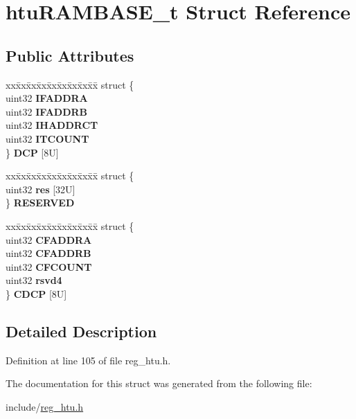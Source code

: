 \hypertarget{structhtuRAMBASE__t}{}\section{htu\+R\+A\+M\+B\+A\+S\+E\+\_\+t Struct Reference}
\label{structhtuRAMBASE__t}
\subsection*{Public Attributes}
\begin{DoxyCompactItemize}
\item 
\mbox{\label{structhtuRAMBASE__t_a7d95d6729e248353cdd01566ae854ad4}} 
\begin{tabbing}
xx\=xx\=xx\=xx\=xx\=xx\=xx\=xx\=xx\=\kill
struct \{\\
\>uint32 {\bfseries IFADDRA}\\
\>uint32 {\bfseries IFADDRB}\\
\>uint32 {\bfseries IHADDRCT}\\
\>uint32 {\bfseries ITCOUNT}\\
\} {\bfseries DCP} \mbox{[}8U\mbox{]}\\

\end{tabbing}\item 
\mbox{\label{structhtuRAMBASE__t_ab33235d0cb470be302f116c6f70e92f7}} 
\begin{tabbing}
xx\=xx\=xx\=xx\=xx\=xx\=xx\=xx\=xx\=\kill
struct \{\\
\>uint32 {\bfseries res} \mbox{[}32U\mbox{]}\\
\} {\bfseries RESERVED}\\

\end{tabbing}\item 
\mbox{\label{structhtuRAMBASE__t_aaf9bc58c369bdd6fe1d2786abebb802b}} 
\begin{tabbing}
xx\=xx\=xx\=xx\=xx\=xx\=xx\=xx\=xx\=\kill
struct \{\\
\>uint32 {\bfseries CFADDRA}\\
\>uint32 {\bfseries CFADDRB}\\
\>uint32 {\bfseries CFCOUNT}\\
\>uint32 {\bfseries rsvd4}\\
\} {\bfseries CDCP} \mbox{[}8U\mbox{]}\\

\end{tabbing}\end{DoxyCompactItemize}


\subsection{Detailed Description}


Definition at line 105 of file reg\+\_\+htu.\+h.



The documentation for this struct was generated from the following file\+:\begin{DoxyCompactItemize}
\item 
include/\mbox{\hyperlink{reg__htu_8h}{reg\+\_\+htu.\+h}}\end{DoxyCompactItemize}
